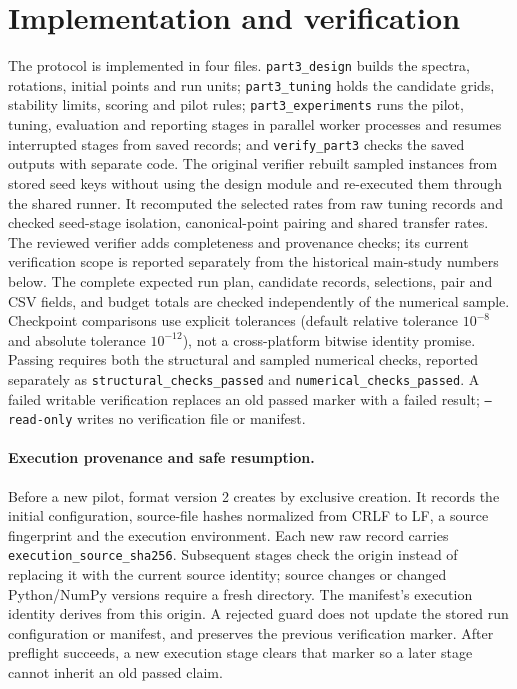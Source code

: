 \documentclass[11pt,a4paper]{article}
\newcommand{\code}[1]{\texttt{#1}}
\begin{document}
\section{Implementation and verification}\label{sec:implementation}
The protocol is implemented in four files. \code{part3\_design} builds the
spectra, rotations, initial points and run units; \code{part3\_tuning} holds the
candidate grids, stability limits, scoring and pilot rules;
\code{part3\_experiments} runs the pilot, tuning, evaluation and reporting
stages in parallel worker processes and resumes interrupted stages from saved
records; and \code{verify\_part3} checks the saved outputs with separate code.
The original verifier rebuilt sampled instances from stored seed keys without
using the design module and re-executed them through the shared runner. It
recomputed the selected rates from raw tuning records and checked seed-stage
isolation, canonical-point pairing and shared transfer rates. The reviewed
verifier adds completeness and provenance checks; its current verification
scope is reported separately from the historical main-study numbers below.
The complete expected run plan, candidate records, selections, pair and CSV
fields, and budget totals are checked independently of the numerical sample.
Checkpoint comparisons use explicit tolerances (default relative tolerance
$10^{-8}$ and absolute tolerance $10^{-12}$), not a cross-platform bitwise
identity promise. Passing requires both the structural and sampled numerical
checks, reported separately as \code{structural\_checks\_passed} and
\code{numerical\_checks\_passed}. A failed writable verification replaces an old passed marker with a
failed result; \code{--read-only} writes no verification file or manifest.

\paragraph{Execution provenance and safe resumption.} Before a new pilot,
format version 2 creates  by exclusive creation.
It records the initial configuration, source-file hashes normalized from CRLF
to LF, a source fingerprint and the execution environment. Each new raw record
carries \code{execution\_source\_sha256}. Subsequent stages check the origin
instead of replacing it with the current source identity; source changes or
changed Python/NumPy versions require a fresh directory. The manifest's
execution identity derives from this origin. A rejected guard does not update
the stored run configuration or manifest, and preserves the previous
verification marker. After preflight succeeds, a new execution stage clears
that marker so a later stage cannot inherit an old passed claim.
\end{document}
